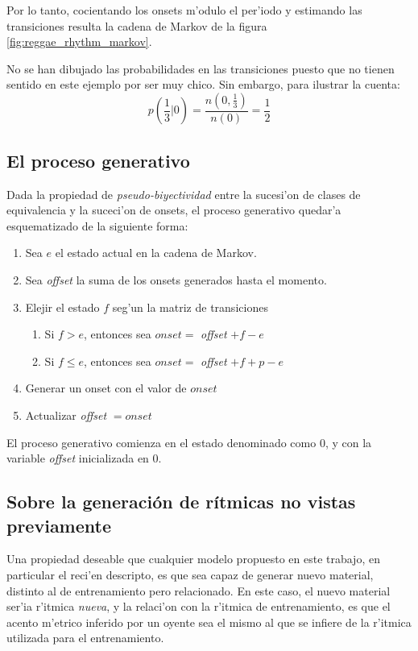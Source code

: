 Por lo tanto, cocientando los onsets m'odulo el per'iodo y estimando las transiciones resulta la cadena de Markov de la figura \ref{fig:reggae_rhythm_markov}.
\begin{imagen}
\end{imagen}

No se han dibujado las probabilidades en las transiciones puesto que no tienen sentido en este ejemplo por ser muy chico. Sin embargo, para ilustrar la cuenta:
$$p(\frac{1}{3}|0) = \frac{n(0, \frac{1}{3})}{n(0)} = \frac{1}{2}$$

\subsection{El proceso generativo}
Dada la propiedad de \emph{pseudo-biyectividad} entre la sucesi'on de clases de equivalencia y la suceci'on de onsets, el proceso generativo quedar'a esquematizado de la siguiente 
forma:

\begin{enumerate}
  \item Sea $e$ el estado actual en la cadena de Markov. 
  \item Sea \emph{offset} la suma de los onsets generados hasta el momento. 
  \item Elejir el estado $f$ seg'un la matriz de transiciones
  \begin{enumerate}
    \item Si $f > e$, entonces sea $onset=$ \emph{offset} $+ f-e$
    \item Si $f \leq e$, entonces sea $onset=$ \emph{offset} $+ f + p - e$
  \end{enumerate}
  \item Generar un onset con el valor de $onset$
  \item Actualizar \emph{offset} $= onset$
\end{enumerate}

El proceso generativo comienza en el estado denominado como $0$, y con la variable \emph{offset} inicializada en $0$.

\subsection{Sobre la generaci\'on de r\'itmicas no vistas previamente}
Una propiedad deseable que cualquier modelo propuesto en este trabajo, en particular el reci'en descripto, es que sea capaz de generar nuevo material, distinto al de entrenamiento
pero relacionado. En este caso, el nuevo material ser'ia r'itmica \emph{nueva}, y la relaci'on con la r'itmica de entrenamiento, es que el acento m'etrico inferido por un oyente 
sea el mismo al que se infiere de la r'itmica utilizada para el entrenamiento. 

